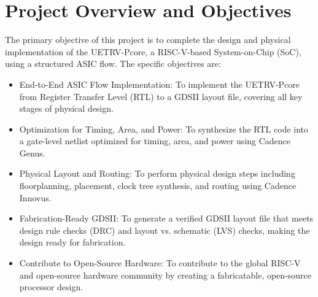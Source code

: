 
\chapter{Project Overview and Objectives}
\label{Chapter4}

The primary objective of this project is to complete the design and physical implementation of the UETRV-Pcore, a RISC-V-based System-on-Chip (SoC), using a structured ASIC flow. The specific objectives are:
\begin{itemize}
    \item End-to-End ASIC Flow Implementation: To implement the UETRV-Pcore from Register Transfer Level (RTL) to a GDSII layout file, covering all key stages of physical design.
    \item Optimization for Timing, Area, and Power: To synthesize the RTL code into a gate-level netlist optimized for timing, area, and power using Cadence Genus.
    \item Physical Layout and Routing: To perform physical design steps including floorplanning, placement, clock tree synthesis, and routing using Cadence Innovus.
    \item Fabrication-Ready GDSII: To generate a verified GDSII layout file that meets design rule checks (DRC) and layout vs. schematic (LVS) checks, making the design ready for fabrication.
    \item Contribute to Open-Source Hardware: To contribute to the global RISC-V and open-source hardware community by creating a fabricatable, open-source processor design.
\end{itemize}




